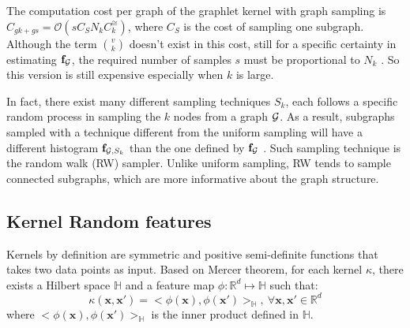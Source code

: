 \documentclass{article}
\begin{document}
The computation cost per graph of the  graphlet kernel with graph sampling is $C_{gk + gs}= \mathcal{O}\left(s C_S N_k C^{\cong}_k\right)$, where $C_S$ is the cost of sampling one subgraph. Although the term $\binom{v}{k}$ doesn't exist  in this cost, still for a specific certainty in estimating $\mathbf{f}_{\mathcal{G}}$, the required number of samples $s$ must be proportional to $N_k$ \cite{graphlet_kernel}. So this version is still expensive especially when $k$ is large. 

In fact, there exist many different sampling techniques $S_k$, each follows a specific random process in sampling the $k$ nodes from a graph $\mathcal{G}$. As a result, subgraphs sampled with a technique different from the uniform sampling will have a different histogram $\mathbf{f}_{\mathcal{G},S_k}$ than the one defined by $\mathbf{f}_{\mathcal{G}}$ \cite{leskovec2006sampling}. Such sampling technique is the random walk (RW) sampler. Unlike uniform sampling, RW tends to sample connected  subgraphs, which are more informative about the graph structure. 


\iffalse
\subsection{Kernel Random features}\label{sec:Random_features}
Kernels by definition are symmetric and positive  semi-definite functions that takes two data points as input. Based on Mercer theorem, for each kernel $\kappa$, there exists a Hilbert space $\mathbb{H}$ and a  feature map $\phi:\mathbb{R}^d\mapsto\mathbb{H}$ such that:  
	\begin{equation}
	\label{eq:kernel_main_equation}
	\kappa(\mathbf{x},\mathbf{x}')=<\phi(\mathbf{x}),\phi(\mathbf{x}')>_\mathbb{H},~ \forall \mathbf{x},\mathbf{x}'\in\mathbb{R}^d
	\end{equation}
	where $<\phi(\mathbf{x}),\phi(\mathbf{x}')>_\mathbb{H}$ is the inner product defined in $\mathbb{H}$.
\end{document}

